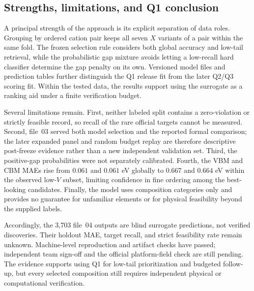 \subsection{Strengths, limitations, and Q1 conclusion}

A principal strength of the approach is its explicit separation of data
roles.  Grouping by ordered cation pair keeps all seven $X$ variants of a
pair within the same fold.  The frozen selection rule considers both global
accuracy and low-tail retrieval, while the probabilistic gap mixture avoids
letting a low-recall hard classifier determine the gap penalty on its own.
Versioned model files and prediction tables further distinguish the Q1
release fit from the later Q2/Q3 scoring fit.  Within the tested data, the
results support using the surrogate as a ranking aid under a finite
verification budget.

Several limitations remain.  First, neither labeled split contains a
zero-violation or strictly feasible record, so recall of the rare official
targets cannot be measured.  Second, file~03 served both model selection
and the reported formal comparison; the later expanded panel and random
budget replay are therefore descriptive post-freeze evidence rather than a
new independent validation set.  Third, the positive-gap probabilities
were not separately calibrated.  Fourth, the VBM and CBM MAEs rise from
$0.061$ and $0.061$ eV globally to $0.667$ and $0.664$ eV within the
observed low-$V$ subset, limiting confidence in fine ordering among the
best-looking candidates.  Finally, the model uses composition categories
only and provides no guarantee for unfamiliar elements or for physical
feasibility beyond the supplied labels.

Accordingly, the 3,703 file~04 outputs are blind surrogate predictions,
not verified discoveries.  Their holdout MAE, target recall, and strict
feasibility rate remain unknown.  Machine-level reproduction and artifact
checks have passed; independent team sign-off and the official
platform-field check are still pending.  The evidence supports using Q1
for low-tail prioritization and budgeted follow-up, but every selected
composition still requires independent physical or computational
verification.
